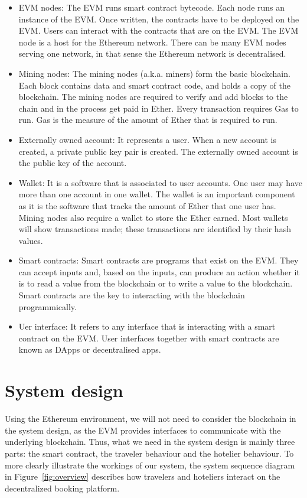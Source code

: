 \documentclass{KERauth}
\begin{document}
\begin{itemize}
    \item EVM nodes: The EVM runs smart contract bytecode. Each node runs an instance of the EVM. Once written, the contracts have to be deployed on the EVM. Users can interact with the contracts that are on the EVM. The EVM node is a host for the Ethereum network. There can be many EVM nodes serving one network, in that sense the Ethereum network is decentralised.
    \item Mining nodes: The mining nodes (a.k.a. miners) form the basic blockchain. Each block contains data and smart contract code, and holds a copy of the blockchain. The mining nodes are required to verify and add blocks to the chain and in the process get paid in Ether. Every transaction requires Gas to run. Gas is the measure of the amount of Ether that is required to run.  
    \item Externally owned account: It represents a user. When a new account is created, a private public key pair is created. The externally owned account is the public key of the account. 
    \item Wallet: It is a software that is associated to user accounts. One user may have more than one account in one wallet. The wallet is an important component as it is the software that tracks the amount of Ether that one user has. Mining nodes also require a wallet to store the Ether earned. Most wallets will show transactions made; these transactions are identified by their hash values.
    \item Smart contracts: Smart contracts are programs that exist on the EVM. They can accept inputs and, based on the inputs, can produce an action whether it is to read a value from the blockchain or to write a value to the blockchain. Smart contracts are the key to interacting with the blockchain programmically. 
    \item Uer interface: It refers to any interface that is interacting with a smart contract on the EVM. User interfaces together with smart contracts are known as DApps or decentralised apps. 
\end{itemize}


\section{System design}
Using the Ethereum environment, we will not need to consider the blockchain in the system design, as the EVM provides interfaces to communicate with the underlying blockchain. Thus, what we need in the system design is mainly three parts: the smart contract, the traveler behaviour and the hotelier behaviour. 
To more clearly illustrate the workings of our system, the system sequence diagram in Figure~\ref{fig:overview} describes
how travelers and hoteliers interact on the decentralized booking platform.
\end{document}
